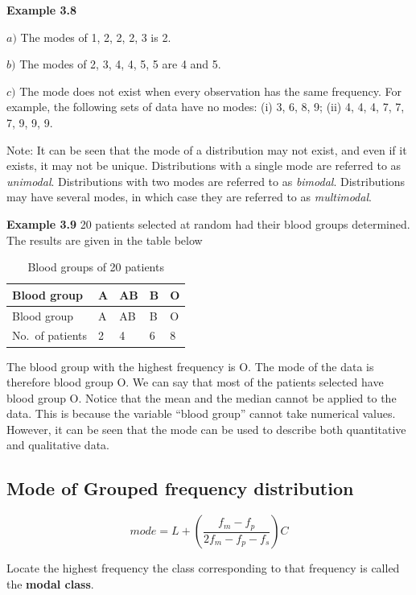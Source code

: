 \documentclass[
]{book}
\begin{document}
\textbf{Example 3.8}

\(a)\) The modes of 1, 2, 2, 2, 3 is 2.

\(b)\) The modes of 2, 3, 4, 4, 5, 5 are 4 and 5.

\(c)\) The mode does not exist when every observation has the same
frequency. For example, the following sets of data have no modes: (i) 3,
6, 8, 9; (ii) 4, 4, 4, 7, 7, 7, 9, 9, 9.

Note: It can be seen that the mode of a distribution may not exist, and
even if it exists, it may not be unique. Distributions with a single
mode are referred to as \emph{unimodal}. Distributions with two modes are
referred to as \emph{bimodal}. Distributions may have several modes, in which
case they are referred to as \emph{multimodal}.

\textbf{Example 3.9} 20 patients selected at random had their blood groups
determined. The results are given in the table below

\begin{longtable}[]{@{}lllll@{}}
\caption{\label{tab:Blood} Blood groups of 20 patients}\tabularnewline
\toprule\noalign{}
Blood group & A & AB & B & O \\
\midrule\noalign{}
\endfirsthead
\toprule\noalign{}
Blood group & A & AB & B & O \\
\midrule\noalign{}
\endhead
\bottomrule\noalign{}
\endlastfoot
No.~of patients & 2 & 4 & 6 & 8 \\
\end{longtable}

The blood group with the highest frequency is O. The mode of the data is
therefore blood group O. We can say that most of the patients selected
have blood group O. Notice that the mean and the median cannot be
applied to the data. This is because the variable ``blood group'' cannot
take numerical values. However, it can be seen that the mode can be used
to describe both quantitative and qualitative data.

\subsection{Mode of Grouped frequency distribution}\label{mode-of-grouped-frequency-distribution}

\[mode = L + \left( \frac{f_{m}-f_{p}}{2f_{m}-f_{p} - f_{s}} \right)C\]

Locate the highest frequency the class corresponding to that frequency
is called the \textbf{modal class}.
\end{document}
